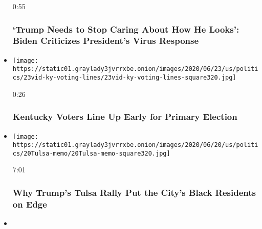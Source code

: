 \begin{itemize}
  0:55

  \hypertarget{trump-needs-to-stop-caring-about-how-he-looks-biden-criticizes-presidents-virus-response}{%
  \subsubsection{`Trump Needs to Stop Caring About How He Looks': Biden
  Criticizes President's Virus
  Response}\label{trump-needs-to-stop-caring-about-how-he-looks-biden-criticizes-presidents-virus-response}}
\item
  \href{https://www.nytimes3xbfgragh.onion/video/us/100000007205944/kentucky-primary-voting.html?action=click\&module=video-series-bar\&region=header\&pgtype=Article\&playlistId=video/2020-Elections}{}

  \texttt{[image: https://static01.graylady3jvrrxbe.onion/images/2020/06/23/us/politics/23vid-ky-voting-lines/23vid-ky-voting-lines-square320.jpg]}

  0:26

  \hypertarget{kentucky-voters-line-up-early-for-primary-election}{%
  \subsubsection{Kentucky Voters Line Up Early for Primary
  Election}\label{kentucky-voters-line-up-early-for-primary-election}}
\item
  \href{https://www.nytimes3xbfgragh.onion/video/us/100000007188759/trump-rally-juneteenth-tulsa-oklahoma.html?action=click\&module=video-series-bar\&region=header\&pgtype=Article\&playlistId=video/2020-Elections}{}

  \texttt{[image: https://static01.graylady3jvrrxbe.onion/images/2020/06/20/us/politics/20Tulsa-memo/20Tulsa-memo-square320.jpg]}

  7:01

  \hypertarget{why-trumps-tulsa-rally-put-the-citys-black-residents-on-edge}{%
  \subsubsection{Why Trump's Tulsa Rally Put the City's Black Residents
  on
  Edge}\label{why-trumps-tulsa-rally-put-the-citys-black-residents-on-edge}}
\item
  \href{https://www.nytimes3xbfgragh.onion/video/us/politics/100000007202285/trump-tulsa-rally-coronavirus.html?action=click\&module=video-series-bar\&region=header\&pgtype=Article\&playlistId=video/2020-Elections}{}


\end{itemize}
